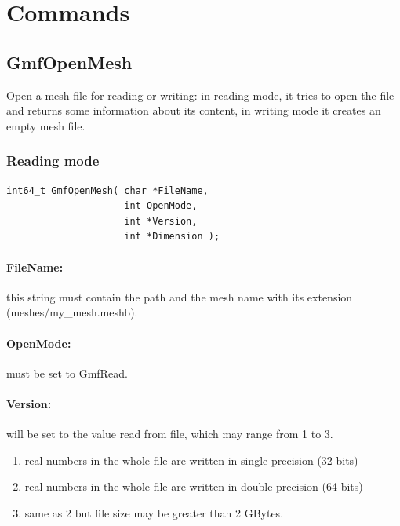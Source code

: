 \documentclass[a4paper,12pt]{article}
\begin{document}
%
%

\newpage
\section{Commands}

\subsection{GmfOpenMesh}
Open a mesh file for reading or writing: in reading mode, it tries to open the file and returns some information about its content, in writing mode it creates an empty mesh file.

\subsubsection{Reading mode}
\begin{tt}
\begin{verbatim}
int64_t GmfOpenMesh( char *FileName,
                     int OpenMode,
                     int *Version,
                     int *Dimension );
\end{verbatim}
\end{tt}
\normalfont

\paragraph{FileName:}
this string must contain the path and the mesh name with its extension (meshes/my\_mesh.meshb).

\paragraph{OpenMode:}
must be set to GmfRead.

\paragraph{Version:}
will be set to the value read from file, which may range from 1 to 3.

\begin{enumerate}
	\item real numbers in the whole file are written in single precision (32 bits)
	\item real numbers in the whole file are written in double precision (64 bits)
	\item same as 2 but file size may be greater than 2 GBytes.
\end{enumerate}
\end{document}
